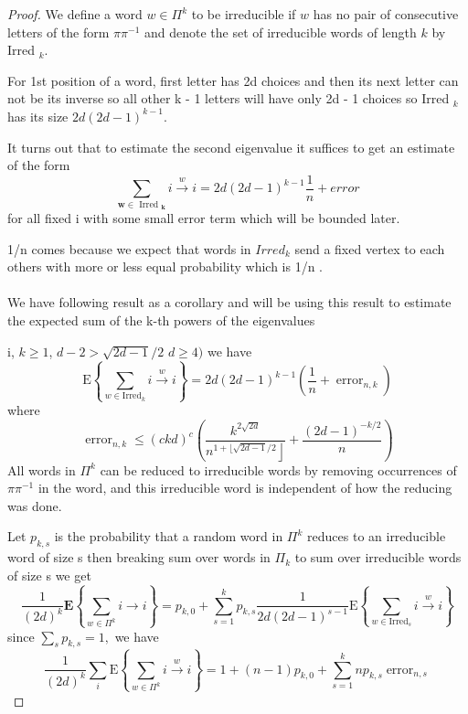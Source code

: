 \documentclass[oneside]{book}
\begin{document}
\begin{proof}
		We define a word $w \in \Pi^{k}$ to be irreducible if $w$ has no pair of consecutive letters of the form $\pi \pi^{-1}$ and denote the set of irreducible words of length $k$ by Irred $_{k} .$\par
		For 1st position of a word, first letter has  2d choices and then its next letter can not be its inverse so all other k - 1 letters will have only 2d - 1 choices so
		Irred $_{k}$ has its  size $2 d(2 d-1)^{k-1} .$ \par 
		It turns out that to estimate the second eigenvalue it suffices
		to get an estimate of the form
		$$
		\sum_{\boldsymbol{w} \in \text { Irred }_{\boldsymbol{k}}} i \stackrel{w}{\rightarrow} i=2 d(2 d-1)^{k-1} \frac{1}{n} + error 
		$$
		for all fixed i with some small error term which will be bounded later.\par
		1/n comes because we expect  that words in $Irred_{k} $ send a fixed vertex to each  others with more or less equal probability which is 1/n . \\\\
		We have following result as a corollary and will be using this result to estimate the expected sum of the k-th powers of the eigenvalues \par
		 i, $k \geq 1$,  $d-2>\sqrt{2 d-1} / 2$  $d \geq 4)$ we have
		$$
		\mathrm{E}\left\{\sum_{w \in \mathrm{Irred}_{k}} i \stackrel{w}{\rightarrow} i\right\}=2 d(2 d-1)^{k-1}\left(\frac{1}{n}+\operatorname{error}_{n, k}\right)
		$$
		where
		$$
		\operatorname{error}_{n, k} \leq(c k d)^{c}\left(\frac{k^{2 \sqrt{2 d}}}{\left.n^{1+\lfloor\sqrt{2 d-1} / 2}\right\rfloor}+\frac{(2 d-1)^{-k / 2}}{n}\right)
		$$
		All words in $\Pi^{k}$ can be reduced to irreducible words by removing occurrences of $\pi \pi^{-1}$ in the word, and this irreducible word is independent of how the reducing was done. \par 
		Let  $p_{k,s}$ is the probability that a random word in  $\Pi^{k}$ reduces to an irreducible word of size s then breaking sum over words in  $\Pi_k$ to sum over irreducible words of size s  we get  
		$$
		\frac{1}{(2 d)^{k}} \mathbf{E}\left\{\sum_{w \in \Pi^{k}} i\rightarrow i\right\}=p_{k, 0}+\sum_{s=1}^{k} p_{k, s} \frac{1}{2 d(2 d-1)^{s-1}} \mathrm{E}\left\{\sum_{w \in \mathrm{Irred}_{s}} i \stackrel{w}{\rightarrow} i\right\}
		$$
		since $\sum_{s} p_{k, s}=1,$ we have
		$$ 
		\frac{1}{(2 d)^{k}} \sum_{i} \mathrm{E}\left\{\sum_{w \in \Pi^{k}} i \stackrel{w}{\rightarrow} i\right\}=1+(n-1) p_{k, 0}+\sum_{s=1}^{k} n p_{k, s} \operatorname{error}_{n, s} 
$$
\end{proof}
\end{document}
